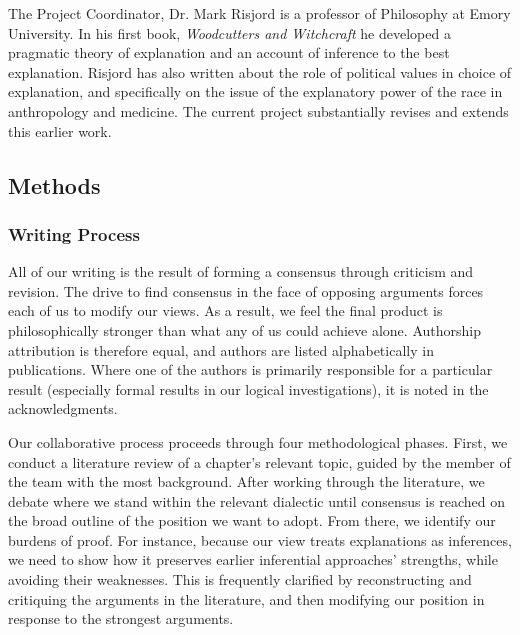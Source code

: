 \documentclass{article}[11pt]
\begin{document}
The Project Coordinator, Dr. Mark Risjord is a professor of Philosophy at Emory University. In his first book, \textit{Woodcutters and Witchcraft} he developed a pragmatic theory of explanation and an account of inference to the best explanation. Risjord has also written about the role of political values in choice of explanation, and specifically on the issue of the explanatory power of the race in anthropology and medicine. The current project substantially revises and extends this earlier work. 

\subsection{Methods}

%
%
\subsubsection*{Writing Process}

All of our writing is the result of forming a consensus through criticism and revision.  The drive to find consensus in the face of opposing arguments forces each of us to modify our views.  As a result, we feel the final product is philosophically stronger than what any of us could achieve alone.  Authorship attribution is therefore equal, and authors are listed alphabetically in publications.  Where one of the authors is primarily responsible for a particular result (especially formal results in our logical investigations), it is noted in the acknowledgments. 

Our collaborative process proceeds through four methodological phases.  First, we conduct a literature review of a chapter’s relevant topic, guided by the member of the team with the most background. After working through the literature, we debate where we stand within the relevant dialectic until consensus is reached on the broad outline of the position we want to adopt. From there, we identify our burdens of proof. For instance, because our view treats explanations as inferences, we need to show how it preserves earlier inferential approaches' strengths, while avoiding their weaknesses. This is frequently clarified by reconstructing  and critiquing the arguments in the literature, and then modifying our position in response to the strongest arguments. 
\end{document}
